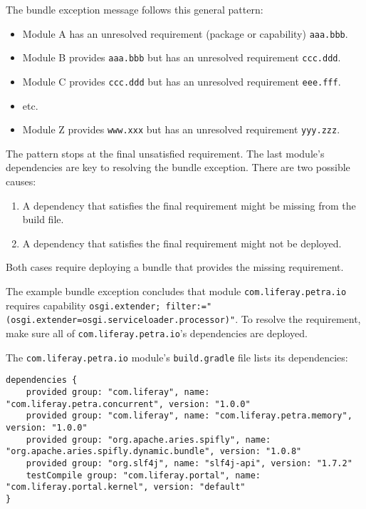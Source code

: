 The bundle exception message follows this general pattern:

\begin{itemize}
\tightlist
\item
  Module A has an unresolved requirement (package or capability)
  \texttt{aaa.bbb}.
\item
  Module B provides \texttt{aaa.bbb} but has an unresolved requirement
  \texttt{ccc.ddd}.
\item
  Module C provides \texttt{ccc.ddd} but has an unresolved requirement
  \texttt{eee.fff}.
\item
  etc.
\item
  Module Z provides \texttt{www.xxx} but has an unresolved requirement
  \texttt{yyy.zzz}.
\end{itemize}

The pattern stops at the final unsatisfied requirement. The last
module's dependencies are key to resolving the bundle exception. There
are two possible causes:

\begin{enumerate}
\def\labelenumi{\arabic{enumi}.}
\item
  A dependency that satisfies the final requirement might be missing
  from the build file.
\item
  A dependency that satisfies the final requirement might not be
  deployed.
\end{enumerate}

Both cases require deploying a bundle that provides the missing
requirement.

The example bundle exception concludes that module
\texttt{com.liferay.petra.io} requires capability
\texttt{osgi.extender;\ filter:="(osgi.extender=osgi.serviceloader.processor)"}.
To resolve the requirement, make sure all of
\texttt{com.liferay.petra.io}'s dependencies are deployed.

The \texttt{com.liferay.petra.io} module's \texttt{build.gradle} file
lists its dependencies:

\begin{verbatim}
dependencies {
    provided group: "com.liferay", name: "com.liferay.petra.concurrent", version: "1.0.0"
    provided group: "com.liferay", name: "com.liferay.petra.memory", version: "1.0.0"
    provided group: "org.apache.aries.spifly", name: "org.apache.aries.spifly.dynamic.bundle", version: "1.0.8"
    provided group: "org.slf4j", name: "slf4j-api", version: "1.7.2"
    testCompile group: "com.liferay.portal", name: "com.liferay.portal.kernel", version: "default"
}
\end{verbatim}


